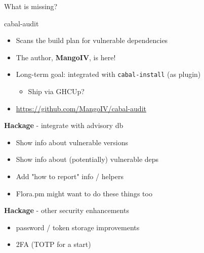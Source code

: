 \documentclass[ignorenonframetext,aspectratio=169,12pt]{beamer}
\begin{document}
\begin{frame}
\centering
\Large
  What is missing?
\end{frame}

\begin{frame}{cabal-audit}
  \begin{itemize}
    \item Scans the build plan for vulnerable dependencies
    \item The author, {\bf MangoIV}, is here!
    \item Long-term goal: integrated with {\tt cabal-install} (as
      plugin)
      \begin{itemize}
        \item Ship via GHCUp?
      \end{itemize}
    \item \url{https://github.com/MangoIV/cabal-audit}
  \end{itemize}
\end{frame}

\begin{frame}[plain]
  \begin{center}
  \end{center}
\end{frame}

\begin{frame}{{\bf Hackage} - integrate with advisory db}
  \begin{itemize}
    \item Show info about vulnerable versions
    \item Show info about (potentially) vulnerable deps
    \item Add "how to report" info / helpers
    \item Flora.pm might want to do these things too
  \end{itemize}
\end{frame}

\begin{frame}{{\bf Hackage} - other security enhancements}
  \begin{itemize}
    \item password / token storage improvements
    \item 2FA (TOTP for a start)
  \end{itemize}
\end{frame}
\end{document}

